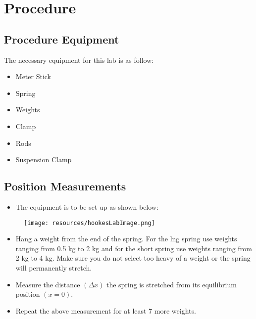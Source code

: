 \begingroup
\let\clearpage\relax\chapter{Procedure}

\section{Procedure Equipment}

The necessary equipment for this lab is as follow: 
\begin{itemize}
  \item Meter Stick
  \item Spring
  \item Weights 
  \item Clamp
  \item Rods
  \item Suspension Clamp
\end{itemize}

\section{Position Measurements}

\begin{itemize}
  \item The equipment is to be set up as shown below:
\end{itemize}

\begin{figure}[h!]
  \centerline{\texttt{[image: resources/hookesLabImage.png]}}
\end{figure}

\begin{itemize}
  \item Hang a weight from the end of the spring. For the lng spring use weights ranging
        from 0.5 kg to 2 kg and for the short spring use weights ranging from 2 kg to 4 
        kg. Make sure you do not select too heavy of a weight or the spring will 
        permanently stretch.
  \item Measure the distance $(\Delta x)$ the spring is stretched from its equilibrium
        position $(x = 0)$.
  \item Repeat the above measurement for at least 7 more weights.
\end{itemize}
